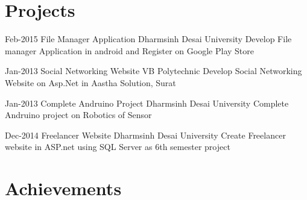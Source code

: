 \documentclass[]{cv-style}          %
\begin{document}

\section{Projects}

\begin{entrylist}
\entry
{Feb-2015}
{File Manager Application }
{Dharmsinh Desai University}
{Develop File manager Application in android and Register on Google Play Store }
{\vspace{-0.3cm}}
\end{entrylist}

\begin{entrylist}
\entry
{Jan-2013}
{Social Networking Website}
{VB Polytechnic}
{Develop Social Networking Website on Asp.Net in Aastha Solution, Surat }
{\vspace{-0.3cm}}
\end{entrylist}

\begin{entrylist}
\entry
{Jan-2013}
{Complete Andruino Project }
{Dharmsinh Desai University}
{Complete Andruino project on Robotics of Sensor }
{\vspace{-0.3cm}}
\end{entrylist}
\begin{entrylist}
\entry
{Dec-2014}
{Freelancer Website}
{Dharmsinh Desai University}
{Create Freelancer website in ASP.net using SQL Server as 6th semester project}
{\vspace{-0.3cm}}


\end{entrylist}


\section{Achievements}
\end{document}

